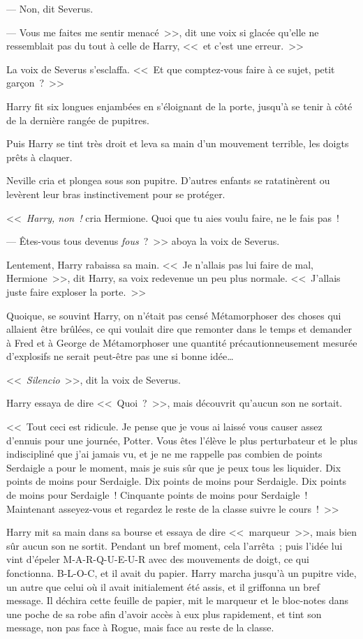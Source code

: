 --- Non, dit Severus.

--- Vous me faites me sentir menacé~>>, dit une voix si glacée qu'elle ne ressemblait pas du tout à celle de Harry, <<~et c'est une erreur.~>>

La voix de Severus s'esclaffa. <<~Et que comptez-vous faire à ce sujet, petit garçon~?~>>

Harry fit six longues enjambées en s'éloignant de la porte, jusqu'à se tenir à côté de la dernière rangée de pupitres.

Puis Harry se tint très droit et leva sa main d'un mouvement terrible, les doigts prêts à claquer.

Neville cria et plongea sous son pupitre. D'autres enfants se ratatinèrent ou levèrent leur bras instinctivement pour se protéger.

<<~\emph{Harry, non~!} cria Hermione. Quoi que tu aies voulu faire, ne le fais pas~!

--- Êtes-vous tous devenus \emph{fous}~?~>> aboya la voix de Severus.

Lentement, Harry rabaissa sa main. <<~Je n'allais pas lui faire de mal, Hermione~>>, dit Harry, sa voix redevenue un peu plus normale. <<~J'allais juste faire exploser la porte.~>>

Quoique, se souvint Harry, on n'était pas censé Métamorphoser des choses qui allaient être brûlées, ce qui voulait dire que remonter dans le temps et demander à Fred et à George de Métamorphoser une quantité précautionneusement mesurée d'explosifs ne serait peut-être pas une si bonne idée…

<<~\emph{Silencio}~>>, dit la voix de Severus.

Harry essaya de dire <<~Quoi~?~>>, mais découvrit qu'aucun son ne sortait.

<<~Tout ceci est ridicule. Je pense que je vous ai laissé vous causer assez d'ennuis pour une journée, Potter. Vous êtes l'élève le plus perturbateur et le plus indiscipliné que j'ai jamais vu, et je ne me rappelle pas combien de points Serdaigle a pour le moment, mais je suis sûr que je peux tous les liquider. Dix points de moins pour Serdaigle. Dix points de moins pour Serdaigle. Dix points de moins pour Serdaigle~! Cinquante points de moins pour Serdaigle~! Maintenant asseyez-vous et regardez le reste de la classe suivre le cours~!~>>

Harry mit sa main dans sa bourse et essaya de dire <<~marqueur~>>, mais bien sûr aucun son ne sortit. Pendant un bref moment, cela l'arrêta~; puis l'idée lui vint d'épeler M-A-R-Q-U-E-U-R avec des mouvements de doigt, ce qui fonctionna. B-L-O-C, et il avait du papier. Harry marcha jusqu'à un pupitre vide, un autre que celui où il avait initialement été assis, et il griffonna un bref message. Il déchira cette feuille de papier, mit le marqueur et le bloc-notes dans une poche de sa robe afin d'avoir accès à eux plus rapidement, et tint son message, non pas face à Rogue, mais face au reste de la classe.

